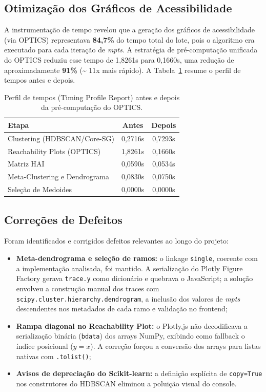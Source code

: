 \documentclass[12pt,a4paper,oneside]{article}
\begin{document}
\subsection{Otimização dos Gráficos de Acessibilidade}

A instrumentação de tempo revelou que a geração dos gráficos de acessibilidade (via OPTICS)
representava \textbf{84,7\%} do tempo total do lote, pois o algoritmo era executado para cada
iteração de \textit{mpts}. A estratégia de pré-computação unificada do OPTICS reduziu esse
tempo de 1,8261s para 0,1660s, uma redução de aproximadamente \textbf{91\%} (\textasciitilde
11x mais rápido). A Tabela~\ref{tab:optics} resume o perfil de tempos antes e depois.

\begin{table}[htbp]
  \centering
  \caption{Perfil de tempos (Timing Profile Report) antes e depois da pré-computação do
           OPTICS.}
  \label{tab:optics}
  \begin{tabular}{lcc}
    \toprule
    \textbf{Etapa} & \textbf{Antes} & \textbf{Depois} \\
    \midrule
    Clustering (HDBSCAN/Core-SG) & 0,2716s & 0,7293s \\
    Reachability Plots (OPTICS)  & 1,8261s & 0,1660s \\
    Matriz HAI                   & 0,0590s & 0,0534s \\
    Meta-Clustering e Dendrograma & 0,0830s & 0,0750s \\
    Seleção de Medoides          & 0,0000s & 0,0000s \\
    \bottomrule
  \end{tabular}
\end{table}

\subsection{Correções de Defeitos}

Foram identificados e corrigidos defeitos relevantes ao longo do projeto:

\begin{itemize}
  \item \textbf{Meta-dendrograma e seleção de ramos:} o linkage \texttt{single}, coerente com a
        implementação analisada, foi mantido. A serialização do Plotly Figure Factory gerava
        \texttt{trace.y} como dicionário e quebrava o JavaScript; a solução envolveu a
        construção manual dos traces com \texttt{scipy.cluster.hierarchy.dendrogram}, a inclusão
        dos valores de \textit{mpts} descendentes nos metadados de cada ramo e validação no
        frontend;
  \item \textbf{Rampa diagonal no Reachability Plot:} o Plotly.js não decodificava a
        serialização binária (\texttt{bdata}) dos arrays NumPy, exibindo como fallback o índice
        posicional ($y = x$). A correção forçou a conversão dos arrays para listas nativas com
        \texttt{.tolist()};
  \item \textbf{Avisos de depreciação do Scikit-learn:} a definição explícita de
        \texttt{copy=True} nos construtores do HDBSCAN eliminou a poluição visual do console.
\end{itemize}
\end{document}
